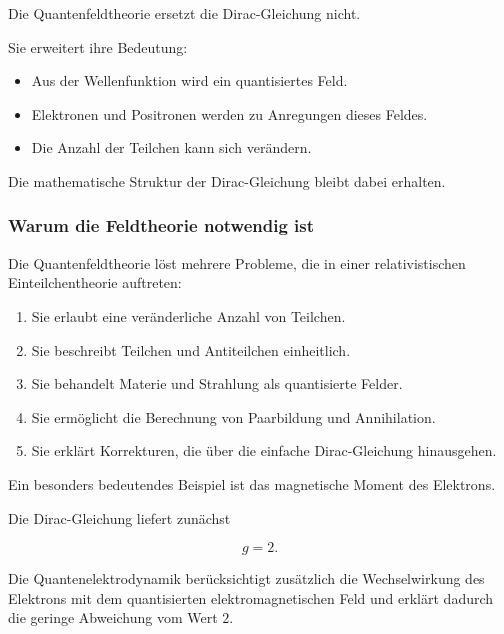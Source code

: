\begin{PhysicsBox}
	\label{box:diracgleichung_in_feldtheorie}
	
	Die Quantenfeldtheorie ersetzt die Dirac-Gleichung nicht.
	
	Sie erweitert ihre Bedeutung:
	
	\begin{itemize}
		\item Aus der Wellenfunktion wird ein quantisiertes Feld.
		\item Elektronen und Positronen werden zu Anregungen dieses Feldes.
		\item Die Anzahl der Teilchen kann sich verändern.
	\end{itemize}
	
	Die mathematische Struktur der Dirac-Gleichung bleibt dabei erhalten.
\end{PhysicsBox}

\subsubsection*{Warum die Feldtheorie notwendig ist}

Die Quantenfeldtheorie löst mehrere Probleme, die in einer
relativistischen Einteilchentheorie auftreten:

\begin{enumerate}
	\item Sie erlaubt eine veränderliche Anzahl von Teilchen.
	\item Sie beschreibt Teilchen und Antiteilchen einheitlich.
	\item Sie behandelt Materie und Strahlung als quantisierte Felder.
	\item Sie ermöglicht die Berechnung von Paarbildung und
	Annihilation.
	\item Sie erklärt Korrekturen, die über die einfache
	Dirac-Gleichung hinausgehen.
\end{enumerate}

Ein besonders bedeutendes Beispiel ist das magnetische Moment des
Elektrons.

Die Dirac-Gleichung liefert zunächst

\begin{equation}
	g
	=
	2.
\end{equation}

Die Quantenelektrodynamik berücksichtigt zusätzlich die Wechselwirkung
des Elektrons mit dem quantisierten elektromagnetischen Feld und
erklärt dadurch die geringe Abweichung vom Wert \(2\).

